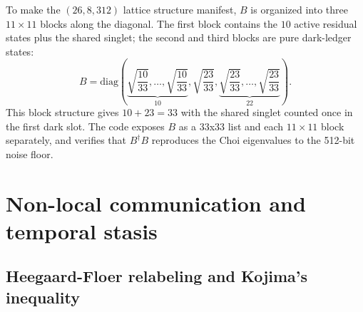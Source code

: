 \documentclass[aps,pra,10pt,onecolumn,superscriptaddress,nofootinbib,longbibliography,floatfix]{revtex4-2}
\begin{document}
To make the $(26,8,312)$ lattice structure manifest, $B$ is organized into three $11 \times 11$ blocks along the diagonal.  The first block contains the $10$ active residual states plus the shared singlet; the second and third blocks are pure dark-ledger states:
%
\begin{equation}
\label{eq:branching-matrix}
B = \mathrm{diag}\!\left(
  \underbrace{\sqrt{\frac{10}{33}},\dots,\sqrt{\frac{10}{33}}}_{10},
  \sqrt{\frac{23}{33}},
  \underbrace{\sqrt{\frac{23}{33}},\dots,\sqrt{\frac{23}{33}}}_{22}
\right) .
\end{equation}
%
This block structure gives $10 + 23 = 33$ with the shared singlet counted once in the first dark slot.  The code exposes $B$ as a 33x33 list and each $11 \times 11$ block separately, and verifies that $B^\dagger B$ reproduces the Choi eigenvalues to the 512-bit noise floor.

\clearpage
\section{Non-local communication and temporal stasis}

\subsection{Heegaard-Floer relabeling and Kojima's inequality}
\end{document}
